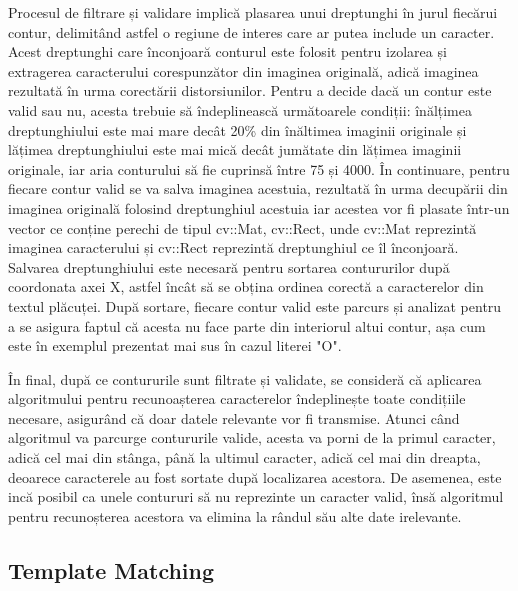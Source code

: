 \documentclass[12pt]{article}
\begin{document}
Procesul de filtrare și validare implic\u{a} plasarea unui dreptunghi \^{i}n jurul fiec\u{a}rui contur, delimit\^{a}nd astfel o regiune de interes care ar putea include un caracter. Acest dreptunghi care \^{i}nconjoar\u{a} conturul este folosit pentru izolarea și extragerea caracterului corespunz\u{a}tor din imaginea original\u{a}, adic\u{a} imaginea rezultat\u{a} \^{i}n urma corect\u{a}rii distorsiunilor. Pentru a decide dac\u{a} un contur este valid sau nu, acesta trebuie s\u{a} \^{i}ndeplineasc\u{a} urm\u{a}toarele condiții: \^{i}n\u{a}lțimea dreptunghiului este mai mare dec\^{a}t 20\% din \^{i}n\u{a}ltimea imaginii originale și l\u{a}țimea dreptunghiului este mai mic\u{a} dec\^{a}t jum\u{a}tate din l\u{a}țimea imaginii originale, iar aria conturului s\u{a} fie cuprins\u{a} \^{i}ntre 75 și 4000. \^{I}n continuare, pentru fiecare contur valid se va salva imaginea acestuia, rezultat\u{a} \^{i}n urma decup\u{a}rii din imaginea original\u{a} folosind dreptunghiul acestuia iar acestea vor fi plasate \^{i}ntr-un vector ce conține perechi de tipul cv::Mat, cv::Rect, unde cv::Mat reprezint\u{a} imaginea caracterului și cv::Rect reprezint\u{a} dreptunghiul ce \^{i}l \^{i}nconjoar\u{a}. Salvarea dreptunghiului este necesar\u{a} pentru sortarea contururilor dup\u{a} coordonata axei X, astfel \^{i}nc\^{a}t s\u{a} se obțina ordinea corect\u{a} a caracterelor din textul pl\u{a}cuței. Dup\u{a} sortare, fiecare contur valid este parcurs și analizat pentru a se asigura faptul c\u{a} acesta nu face parte din interiorul altui contur, așa cum este \^{i}n exemplul prezentat mai sus \^{i}n cazul literei "O".

\^{I}n final, dup\u{a} ce contururile sunt filtrate și validate, se consider\u{a} c\u{a} aplicarea algoritmului pentru recunoașterea caracterelor \^{i}ndeplinește toate condițiile necesare, asigur\^{a}nd c\u{a} doar datele relevante vor fi transmise. Atunci c\^{a}nd algoritmul va parcurge contururile valide, acesta va porni de la primul caracter, adic\u{a} cel mai din st\^{a}nga, p\^{a}n\u{a} la ultimul caracter, adic\u{a} cel mai din dreapta, deoarece caracterele au fost sortate dup\u{a} localizarea acestora. De asemenea, este inc\u{a} posibil ca unele contururi s\u{a} nu reprezinte un caracter valid, \^{i}ns\u{a} algoritmul pentru recunoșterea acestora va elimina la r\^{a}ndul s\u{a}u alte date irelevante.

\subsection{Template Matching}
\end{document}
